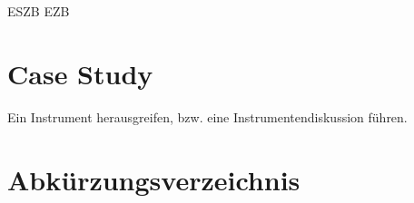 \documentclass[
onecolumn,
a4paper,
abstracton,
parskip=half
,final
]{scrartcl}
\begin{document}
\clearpage
\ac{ESZB}
\ac{EZB}



\section{Case Study}
\label{sec1:caseStudy}
Ein Instrument herausgreifen, bzw. eine Instrumentendiskussion f{\"u}hren.

\subsection{}
\subsection{}
\subsection{}



\clearpage

\section{Abk{\"u}rzungsverzeichnis}

\begin{acronym}[ESZB]
\end{acronym}


\vspace{10pt}
\singlespacing

\newpage





%
\end{document}
